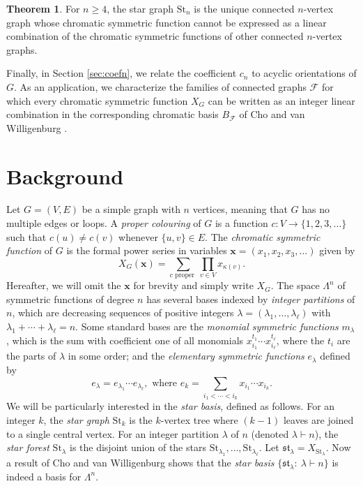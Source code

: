 \documentclass[12pt]{amsart}  %
\theoremstyle{definition}
\newtheorem{theorem}{Theorem}[section]
\theoremstyle{remark}
\numberwithin{equation}{section}
\begin{document}
\begin{theorem}
For $n\geq 4$, the star graph $\text{St}_n$ is the unique connected $n$-vertex graph whose chromatic symmetric function cannot be expressed as a linear combination of the chromatic symmetric functions of other connected $n$-vertex graphs. 
\end{theorem}

Finally, in Section \ref{sec:coefn}, we relate the coefficient $c_n$ to acyclic orientations of $G$. As an application, we characterize the families of connected graphs $\mathcal F$ for which every chromatic symmetric function $X_G$ can be written as an integer linear combination in the corresponding chromatic basis $B_{\mathcal F}$ of Cho and van Willigenburg \cite{chrombases}.

\section{Background}

Let $G=(V,E)$ be a simple graph with $n$ vertices, meaning that $G$ has no multiple edges or loops. A \emph{proper colouring} of $G$ is a function $c:V\to\{1,2,3,\ldots\}$ such that $c(u)\neq c(v)$ whenever $\{u,v\}\in E$. The \emph{chromatic symmetric function} of $G$ is the formal power series in variables $\bm x=(x_1,x_2,x_3,\ldots)$ given by
\begin{equation*}
X_G (\bm{x})=\sum_{c\text{ proper }}\prod_{v\in V}x_{\kappa(v)}.
\end{equation*}
Hereafter, we will omit the $\bm x$ for brevity and simply write $X_G$.
The space $\Lambda^n$ of symmetric functions of degree $n$ has several bases indexed by \emph{integer partitions} of $n$, which are decreasing sequences of positive integers $\lambda=(\lambda_1,\ldots,\lambda_\ell)$ with $\lambda_1+\cdots+\lambda_\ell=n$. Some standard bases are the \emph{monomial symmetric functions} $m_\lambda$, which is the sum with coefficient one of all monomials $x_{i_1}^{t_1}\cdots x_{i_\ell}^{t_\ell}$, where the $t_i$ are the parts of $\lambda$ in some order; and the \emph{elementary symmetric functions} $e_\lambda$ defined by 
\begin{equation*}
e_\lambda=e_{\lambda_1}\cdots e_{\lambda_\ell},\text{ where }e_k=\sum_{i_1<\cdots<i_k}x_{i_1}\cdots x_{i_k}.
\end{equation*}
We will be particularly interested in the \emph{star basis}, defined as follows. For an integer $k$, the \emph{star graph} $\text{St}_k$ is the $k$-vertex tree where $(k-1)$ leaves are joined to a single central vertex. For an integer partition $\lambda$ of $n$ (denoted $\lambda\vdash n$), the \emph{star forest} $\text{St}_\lambda$ is the disjoint union of the stars $\text{St}_{\lambda_1},\ldots,\text{St}_{\lambda_\ell}$. Let $\mathfrak{st}_\lambda=X_{\text{St}_\lambda}$. Now a result of Cho and van Willigenburg \cite[Theorem 5]{chrombases} shows that the \emph{star basis} $\{\mathfrak{st}_\lambda: \ \lambda\vdash n\}$ is indeed a basis for $\Lambda^n$. \\
\end{document}
